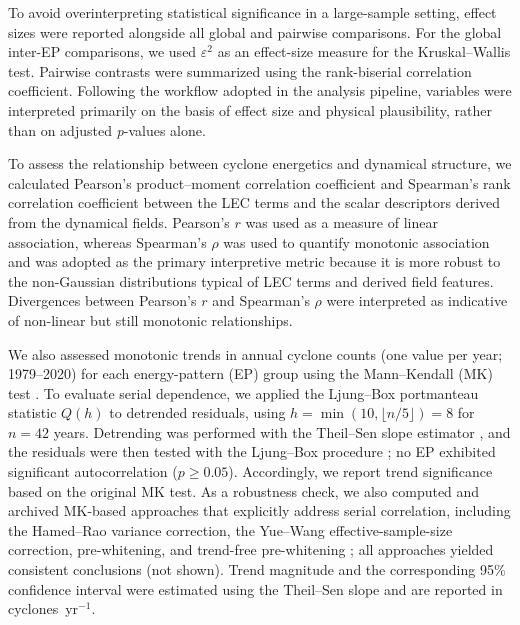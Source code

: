 \documentclass[pdflatex,sn-chicago]{sn-jnl}%
\theoremstyle{plain}
\theoremstyle{definition}
\theoremstyle{remark}
\theoremstyle{definition}
\begin{document}
To avoid overinterpreting statistical significance in a large-sample setting, effect sizes were reported alongside all global and pairwise comparisons. For the global inter-EP comparisons, we used \(\varepsilon^2\) as an effect-size measure for the Kruskal--Wallis test. Pairwise contrasts were summarized using the rank-biserial correlation coefficient. Following the workflow adopted in the analysis pipeline, variables were interpreted primarily on the basis of effect size and physical plausibility, rather than on adjusted \emph{p}-values alone. 

To assess the relationship between cyclone energetics and dynamical structure, we calculated Pearson's product--moment correlation coefficient \citep{pearson1920notes} and Spearman's rank correlation coefficient \citep{spearman1987proof} between the LEC terms and the scalar descriptors derived from the dynamical fields. Pearson's \(r\) was used as a measure of linear association, whereas Spearman's \(\rho\) was used to quantify monotonic association and was adopted as the primary interpretive metric because it is more robust to the non-Gaussian distributions typical of LEC terms and derived field features. Divergences between Pearson's \(r\) and Spearman's \(\rho\) were interpreted as indicative of non-linear but still monotonic relationships. 

We also assessed monotonic trends in annual cyclone counts (one value per year; 1979--2020) for each energy-pattern (EP) group using the Mann--Kendall (MK) test \citep{mann1945nonparametric,kendall1948rank}. To evaluate serial dependence, we applied the Ljung--Box portmanteau statistic $Q(h)$ to detrended residuals, using $h=\min(10,\lfloor n/5\rfloor)=8$ for $n=42$ years. Detrending was performed with the Theil--Sen slope estimator \citep{sen1968estimates}, and the residuals were then tested with the Ljung--Box procedure \citep{ljung1978measure}; no EP exhibited significant autocorrelation ($p\ge 0.05$). Accordingly, we report trend significance based on the original MK test. As a robustness check, we also computed and archived MK-based approaches that explicitly address serial correlation, including the Hamed--Rao variance correction, the Yue--Wang effective-sample-size correction, pre-whitening, and trend-free pre-whitening \citep{KulkarniVonStorch1995,hamed1998modified,YueEtAl2002_TFPW,YueWang2004}; all approaches yielded consistent conclusions (not shown). Trend magnitude and the corresponding 95\% confidence interval were estimated using the Theil--Sen slope and are reported in cyclones~yr$^{-1}$.
\end{document}
